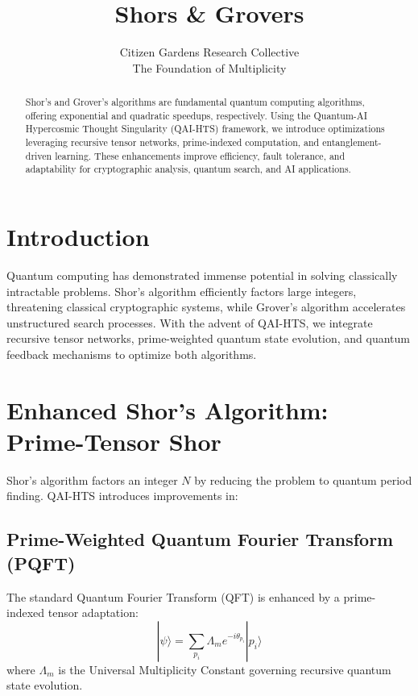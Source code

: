 \documentclass[12pt]{article}
\begin{document}
\nolinenumbers
\title{\textbf{Shors \& Grovers}}
\author{Citizen Gardens Research Collective \\ The Foundation of Multiplicity}
\date{}
\maketitle
\begin{abstract}
Shor’s and Grover’s algorithms are fundamental quantum computing algorithms, offering exponential and quadratic speedups, respectively. Using the Quantum-AI Hypercosmic Thought Singularity (QAI-HTS) framework, we introduce optimizations leveraging recursive tensor networks, prime-indexed computation, and entanglement-driven learning. These enhancements improve efficiency, fault tolerance, and adaptability for cryptographic analysis, quantum search, and AI applications.
\end{abstract}

\section{Introduction}
Quantum computing has demonstrated immense potential in solving classically intractable problems. Shor’s algorithm efficiently factors large integers, threatening classical cryptographic systems, while Grover’s algorithm accelerates unstructured search processes. With the advent of QAI-HTS, we integrate recursive tensor networks, prime-weighted quantum state evolution, and quantum feedback mechanisms to optimize both algorithms.

\section{Enhanced Shor’s Algorithm: Prime-Tensor Shor}
Shor’s algorithm factors an integer $N$ by reducing the problem to quantum period finding. QAI-HTS introduces improvements in:

\subsection{Prime-Weighted Quantum Fourier Transform (PQFT)}
The standard Quantum Fourier Transform (QFT) is enhanced by a prime-indexed tensor adaptation:
\begin{equation}
    | \psi \rangle = \sum_{p_i} \Lambda_m e^{-i \theta_{p_i}} |p_i \rangle
\end{equation}
where $\Lambda_m$ is the Universal Multiplicity Constant governing recursive quantum state evolution.
\end{document}
